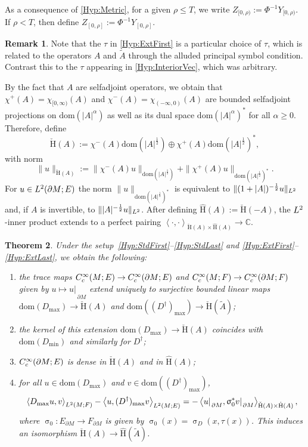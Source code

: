 \documentclass[a4paper,10pt,reqno]{amsart}
\newcommand{\sym}{\upsigma}
\newcommand{\rest}[1]{{{\lvert_{}}_{}}_{#1}}
\newcommand{\C}{\mathbb{C}}
\newcommand{\modulus}[1]{|#1|}
\newcommand{\norm}[1]{\| #1 \|}%
\newcommand{\Lp}[2][{}]{{\rm L}^{#2}_{\rm #1}}%
\newcommand{\Ck}[2][{}]{{\rm C}^{#2}_{\rm #1}}%
\newcommand{\checkH}{\check{\mathrm{H}}}
\newcommand{\hatH}{\hat{\mathrm{H}}}
\newcommand{\dom}{\mathrm{dom}}
\newcommand{\inprod}[1]{\left\langle #1 \right\rangle}%
\newcommand{\dM}{\partial M}
\newtheorem{theorem}{Theorem}[section]
\theoremstyle{definition}
\newtheorem{remark}[theorem]{Remark}
\begin{document}
As a consequence of \ref{Hyp:Metric}, for a given $\rho \leq T$, we write $Z_{[0,\rho)} := \Phi^{-1} Y_{[0,\rho)}$.
If $\rho < T$, then define $Z_{[0, \rho]} := \Phi^{-1} Y_{[0, \rho]}$.

\begin{remark}
Note that the $\tau$ in \ref{Hyp:ExtFirst} is a particular choice of $\tau$, which is related to the operators $A$ and $\tilde{A}$ through the alluded principal symbol condition.
Contrast this to the $\tau$ appearing in \ref{Hyp:InteriorVec}, which was arbitrary.
\end{remark}

By the fact that $A$ are selfadjoint operators, we obtain that $\chi^{+}(A) = \chi_{[0,\infty)}(A)$ and $\chi^-(A) = \chi_{(-\infty,0)}(A)$ are bounded selfadjoint projections on $\dom(\modulus{A}^\alpha)$ as well as its dual space $\dom(\modulus{A}^\alpha)^\ast$  for all $\alpha \geq 0$.
Therefore, define
$$
\checkH(A) := \chi^-(A) \dom(\modulus{A}^{\frac12}) \oplus \chi^+(A) \dom(\modulus{A}^{\frac12})^\ast,
$$
with norm
$$
\norm{u}_{\checkH(A)} := \norm{\chi^-(A)u}_{\dom(\modulus{A}^\frac12)}  + \norm{\chi^+(A)u}_{ \dom(\modulus{A}^\frac12)^\ast}.
$$
For $u\in\Lp{2}(\dM;E)$ the norm $\norm{u}_{\dom(\modulus{A}^\frac12)^\ast}$ is equivalent to $\norm{(1+|A|)^{-\frac12}u}_{\Lp{2}}$ and, if $A$ is invertible, to $\norm{|A|^{-\frac12}u}_{\Lp{2}}$.
After defining $\hatH(A) := \checkH(-A)$, the $\Lp{2}$-inner product extends to a perfect pairing $\inprod{\cdot,\cdot}_{\checkH(A) \times \hatH(A)} \to \C$.

\begin{theorem}
\label{Thm:MaxDom}
Under the  setup~\ref{Hyp:StdFirst}--\ref{Hyp:StdLast} and  \ref{Hyp:ExtFirst}--\ref{Hyp:ExtLast}, we obtain the following:
\begin{enumerate}[label=(\roman*), labelwidth=0pt, labelindent=2pt, leftmargin=21pt]
\item \label{Thm:MaxDom:1}
      the trace maps $\Ck[c]{\infty}(M;E) \to \Ck[c]{\infty}(\dM;E)$ and $\Ck[c]{\infty}(M;F) \to \Ck[c]{\infty}(\dM;F)$
      given by $u \mapsto u\rest{\dM}$ extend uniquely to surjective bounded linear maps
      $\dom( D_{\max}) \to \checkH(A)$ and $\dom( (D^\dagger)_{\max}) \to \checkH(\tilde{A})$;
\item \label{Thm:MaxDom:1.5}
      the kernel of this extension $\dom( D_{\max}) \to \checkH(A)$ coincides with $\dom( D_{\min})$ and similarly for $D^\dagger$;
\item \label{Thm:MaxDom:1.7}
      $\Ck[c]{\infty}(\dM;E)$ is dense in $\checkH(A)$ and in $\hatH(A)$;
\item \label{Thm:MaxDom:2}
      for all $u \in \dom(D_{\max})$ and $v \in \dom((D^\dagger)_{\max})$,
      \begin{equation}
      \label{Eq:MaxDInt}
      \inprod{D_{\max} u, v}_{\Lp{2}(M;F)} - \inprod{u, (D^\dagger)_{\max}v}_{\Lp{2}(M;E)} = -\inprod{ u\rest{\dM}, \sym_0^\ast v\rest{\dM}}_{\checkH(A) \times \hatH(A)},
      \end{equation}
      where $\sym_0: E_{\dM} \to F_{\dM}$ is given by $\sym_0(x) = \sym_D(x,\tau(x))$. 
This induces an isomorphism $\checkH(A)\to \hatH(\tilde{A})$.
\end{enumerate}
\end{theorem}
\end{document}
